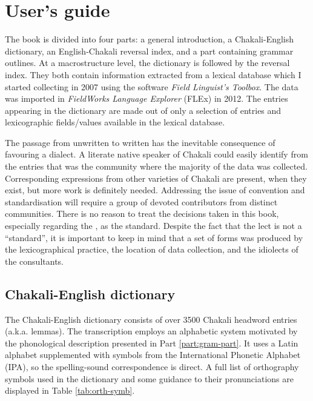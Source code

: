  
\chapter{User's guide}
\label{sec:cont-descr}

The book is divided into four parts: a general introduction, a Chakali-English dictionary, an English-Chakali reversal index, 
and a part containing grammar outlines. At a macrostructure level, the dictionary is followed by the reversal index. They both contain information extracted  from a  lexical database which I started  collecting  in 2007 using the software {\it Field Linguist’s Toolbox}. The data was imported in {\it FieldWorks Language Explorer}  (FLEx) in  2012.  The entries appearing in the dictionary are made out of  only a selection of  entries and lexicographic fields/values available in the lexical database.

The passage from unwritten to written has the inevitable consequence of favouring a dialect. A literate native speaker of Chakali could easily identify from the entries that  was the community where the majority of the data was collected.  Corresponding expressions from other varieties of Chakali are present, when they exist,  but more work is definitely needed.   Addressing the issue of convention and standardisation will require a  group of devoted contributors from distinct communities. There is no reason to treat the decisions taken in this book, especially regarding the ,  as the standard. Despite the fact that the  lect is not a ``standard'', it is important to keep in mind that  a set of forms was produced by the lexicographical practice, the location of data collection, and the idiolects of the consultants.

\section{Chakali-English dictionary}
\label{sec:cli-eng-entry}

The Chakali-English dictionary consists of over 3500 Chakali headword entries (a.k.a. lemmas). The transcription employs an alphabetic system motivated by the phonological   description presented in Part \ref{part:gram-part}.  It uses a Latin alphabet supplemented with symbols from the International Phonetic Alphabet (IPA), so the spelling-sound correspondence is direct.  A full list of orthography symbols used in the dictionary and some guidance to their pronunciations are displayed in Table \ref{tab:orth-symb}.



